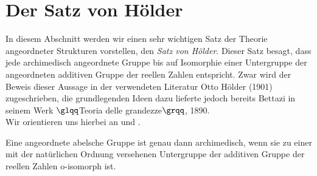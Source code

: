 \section{Der Satz von Hölder}
In diesem Abschnitt werden wir einen sehr wichtigen Satz der Theorie angeordneter Strukturen vorstellen, den \textit{Satz von Hölder}. Dieser Satz besagt, dass jede archimedisch angeordnete Gruppe bis auf Isomorphie einer Untergruppe der angeordneten additiven Gruppe der reellen Zahlen entspricht. Zwar wird der Beweis dieser Aussage in der verwendeten Literatur Otto Hölder (1901)\cite{hoelder1901} zugeschrieben, die grundlegenden Ideen dazu lieferte jedoch bereits Bettazi in seinem Werk $\glqq$Teoria delle grandezze$\grqq$, 1890\cite[S. 578]{Lueneburg08}.\\
Wir orientieren uns hierbei an \cite{hoelder1901} und \cite{priesscrampe83}. 
\begin{satz}\label{aga} %
Eine angeordnete abelsche Gruppe ist genau dann archimedisch, wenn sie zu einer mit der natürlichen Ordnung versehenen Untergruppe der additiven Gruppe der reellen Zahlen o-isomorph ist.
\end{satz}
%
%
